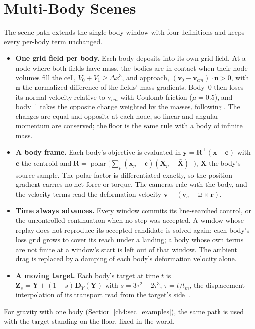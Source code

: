 \section{Multi-Body Scenes}
\label{ch4:sec_scene}
The scene path extends the single-body window with four definitions and keeps every per-body term unchanged.
\begin{itemize}
  \item \textbf{One grid field per body.} Each body deposits into its own grid field. At a node where both fields have
        mass, the bodies are in contact when their node volumes fill the cell, $V_0+V_1\ge\Delta x^3$, and approach,
        $(\mathbf{v}_0-\mathbf{v}_{cm})\cdot\mathbf{n}>0$, with $\mathbf{n}$ the normalized difference of the fields' mass
        gradients. Body~0 then loses its normal velocity relative to $\mathbf{v}_{cm}$ with Coulomb friction ($\mu=0.5$), and
        body~1 takes the opposite change weighted by the masses, following
        \citet{bardenhagen2000granular}. The changes are equal and opposite at each node, so linear and angular momentum
        are conserved; the floor is the same rule with a body of infinite mass.
  \item \textbf{A body frame.} Each body's objective is evaluated in $\mathbf{y}=\mathbf{R}^{\top}(\mathbf{x}-\mathbf{c})$ with
        $\mathbf{c}$ the centroid and $\mathbf{R}=\operatorname{polar}\big(\sum_p(\mathbf{x}_p-\mathbf{c})(\mathbf{X}_p-\bar{\mathbf{X}})^{\top}\big)$,
        $\mathbf{X}$ the body's source sample. The polar factor is differentiated exactly, so the position gradient carries no
        net force or torque. The cameras ride with the body, and the velocity terms read the deformation velocity
        $\mathbf{v}-(\mathbf{v}_c+\boldsymbol{\omega}\times\mathbf{r})$.
  \item \textbf{Time always advances.} Every window commits its line-searched control, or the uncontrolled continuation when
        no step was accepted. A window whose replay does not reproduce its accepted candidate is solved again; each body's
        loss grid grows to cover its reach under a landing; a body whose own terms are not finite at a window's start is left
        out of that window. The ambient drag is replaced by a damping of each body's deformation velocity alone.
  \item \textbf{A moving target.} Each body's target at time $t$ is
        $\mathbf{Z}_s=\mathbf{Y}+(1-s)\,\mathbf{D}_Y(\mathbf{Y})$ with $s=3\tau^2-2\tau^3$, $\tau=t/t_m$, the displacement
        interpolation of its transport read from the target's side~\citep{mccann1997convexity}.
\end{itemize}
For gravity with one body (Section~\ref{ch4:sec_examples}), the same path is used with the target standing on the floor,
fixed in the world.

